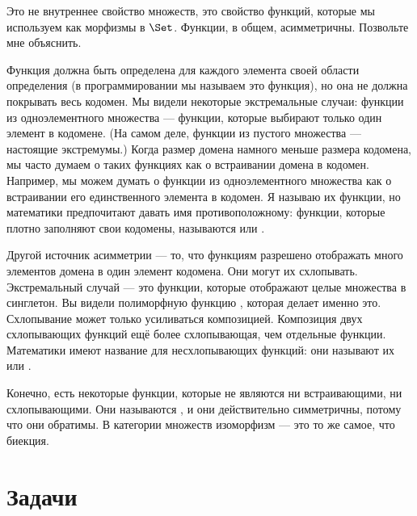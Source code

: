 Это не внутреннее свойство множеств, это свойство функций,
которые мы используем как морфизмы в $\Set$. Функции, в общем,
асимметричны. Позвольте мне объяснить.

Функция должна быть определена для каждого элемента своей области определения (в
программировании мы называем это  функция), но она не должна
покрывать весь кодомен. Мы видели некоторые экстремальные случаи: функции
из одноэлементного множества --- функции, которые выбирают только один элемент в
кодомене. (На самом деле, функции из пустого множества --- настоящие
экстремумы.) Когда размер домена намного меньше размера
кодомена, мы часто думаем о таких функциях как о встраивании домена
в кодомен. Например, мы можем думать о функции из
одноэлементного множества как о встраивании его единственного элемента в кодомен. Я называю
их  функции, но математики предпочитают давать
имя противоположному: функции, которые плотно заполняют свои кодомены,
называются  или .

Другой источник асимметрии --- то, что функциям разрешено отображать много
элементов домена в один элемент кодомена. Они могут
их схлопывать. Экстремальный случай --- это функции, которые отображают целые множества в
синглетон. Вы видели полиморфную функцию , которая делает
именно это. Схлопывание может только усиливаться композицией.
Композиция двух схлопывающих функций ещё более схлопывающая, чем
отдельные функции. Математики имеют название для несхлопывающих
функций: они называют их  или .

Конечно, есть некоторые функции, которые не являются ни встраивающими, ни
схлопывающими. Они называются , и они действительно
симметричны, потому что они обратимы. В категории множеств
изоморфизм --- это то же самое, что биекция.

\section{Задачи}

